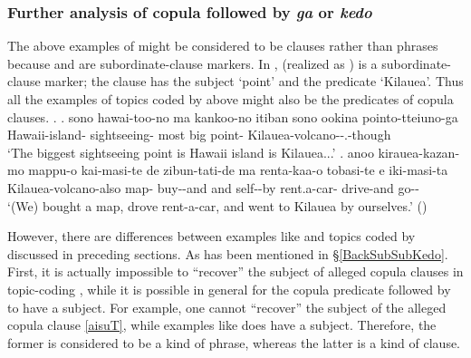 
\subsubsection{Further analysis of copula followed by \textit{ga} or \textit{kedo}}

The above examples of  might be considered to be clauses rather than phrases
because  and  are subordinate-clause markers.
In \Next,
 (realized as ) is a subordinate-clause marker;
the clause has the subject  `point' and the predicate  `Kilauea'.
Thus all the examples of topics coded by  above might also be the predicates of copula clauses.
%
\ex. \ag. sono hawai-too-no ma kankoo-no itiban sono ookina pointo-tteiuno-ga  \\
		 Hawaii-island-  sightseeing- most  big point- Kilauea-volcano--.-though \\
		`The biggest sightseeing point is Hawaii island is Kilauea...'
	\bg. anoo kirauea-kazan-mo mappu-o kai-masi-te de zibun-tati-de ma renta-kaa-o tobasi-te e iki-masi-ta \\
	 Kilauea-volcano-also map- buy--and and self--by  rent.a-car- drive-and  go-- \\
	`(We) bought a map, drove rent-a-car, and went to Kilauea by ourselves.'
		\hfill{()}

However, there are differences between examples like \Last
and topics coded by  discussed in preceding sections.
As has been mentioned in \S \ref{BackSubSubKedo}.
First,
it is actually impossible to ``recover'' the subject of alleged copula clauses in topic-coding ,
while it is possible in general for the copula predicate followed by  to have a subject.
For example,
one cannot ``recover'' the subject of the alleged copula clause \ref{aisuT},
while examples like \Last does have a subject.
Therefore,
the former is considered to be a kind of phrase,
whereas the latter is a kind of clause.

